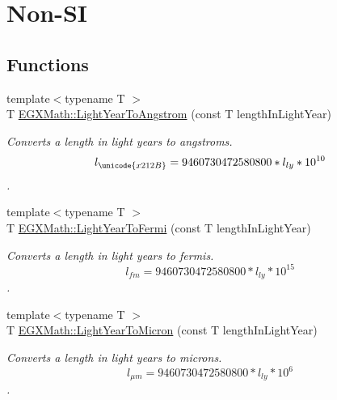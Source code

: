 \hypertarget{group___e_g_x_math-_conversions-_length_conversions-_astronomical-_light_year-_non-_s_i}{}\section{Non-\/\+SI}
\label{group___e_g_x_math-_conversions-_length_conversions-_astronomical-_light_year-_non-_s_i}
\subsection*{Functions}
\begin{DoxyCompactItemize}
\item 
{\footnotesize template$<$typename T $>$ }\\T \mbox{\hyperlink{group___e_g_x_math-_conversions-_length_conversions-_astronomical-_light_year-_non-_s_i_ga09634a7c514e3a0f573e7c171a791f78}{E\+G\+X\+Math\+::\+Light\+Year\+To\+Angstrom}} (const T length\+In\+Light\+Year)
\begin{DoxyCompactList}\small\item\em Converts a length in light years to angstroms. \[ l_{\unicode{x212B}}=9460730472580800 * l_{ly} * 10^{10} \]. \end{DoxyCompactList}\item 
{\footnotesize template$<$typename T $>$ }\\T \mbox{\hyperlink{group___e_g_x_math-_conversions-_length_conversions-_astronomical-_light_year-_non-_s_i_gaf3a2acd1e1653e2cecd6c299abe78524}{E\+G\+X\+Math\+::\+Light\+Year\+To\+Fermi}} (const T length\+In\+Light\+Year)
\begin{DoxyCompactList}\small\item\em Converts a length in light years to fermis. \[ l_{fm}=9460730472580800 * l_{ly} * 10^{15} \]. \end{DoxyCompactList}\item 
{\footnotesize template$<$typename T $>$ }\\T \mbox{\hyperlink{group___e_g_x_math-_conversions-_length_conversions-_astronomical-_light_year-_non-_s_i_gaa1be4e14f5ac7b272f28ce3e115b61c7}{E\+G\+X\+Math\+::\+Light\+Year\+To\+Micron}} (const T length\+In\+Light\+Year)
\begin{DoxyCompactList}\small\item\em Converts a length in light years to microns. \[ l_{\mu m}=9460730472580800 * l_{ly} * 10^{6} \]. \end{DoxyCompactList}\item 

\end{DoxyCompactItemize}
